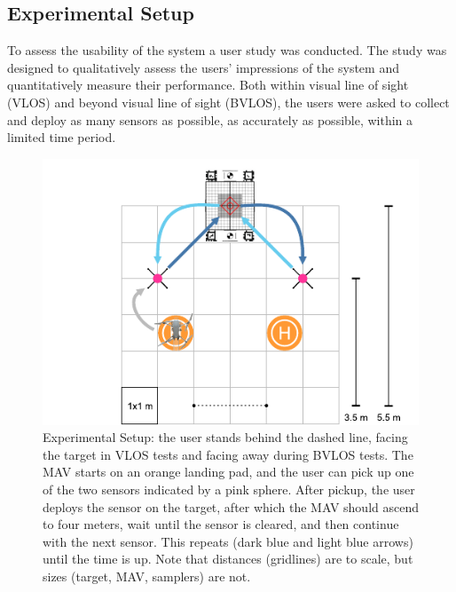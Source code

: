 

\subsection{Experimental Setup}

To assess the usability of the system a user study was conducted. The study was designed to qualitatively assess the users' impressions of the system and quantitatively measure their performance. Both within visual line of sight (VLOS) and beyond visual line of sight (\ac{BVLOS}), the users were asked to collect and deploy as many sensors as possible, as accurately as possible, within a limited time period.


\begin{figure}[!t]
\centering
\includegraphics[width=1\columnwidth]{chapters/papers/UR/figures/fig-3-experimental-setup/fig-3-experimental-setup.pdf}
\caption{Experimental Setup: the user stands behind the dashed line, facing the target in VLOS tests and facing away during BVLOS tests. The \ac{MAV} starts on an orange landing pad, and the user can pick up one of the two sensors indicated by a pink sphere. After pickup, the user deploys the sensor on the target, after which the \ac{MAV} should ascend to four meters, wait until the sensor is cleared, and then continue with the next sensor. This repeats (dark blue and light blue arrows) until the time is up. Note that distances (gridlines) are to scale, but sizes (target, \ac{MAV}, samplers) are not.}
\label{fig:fig3-experimental-setup}
\figurevspacebelow
\end{figure}

